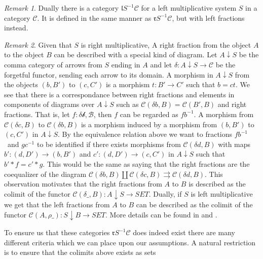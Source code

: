 \documentclass[12pt]{article}
\theoremstyle{definition}
\theoremstyle{remark}
\newtheorem*{remark}{Remark}
\begin{document}
            \begin{remark}
                Dually there is a category $\mathfrak{l}S^{-1}\mathcal{C}$ for a left multiplicative system $S$ in a category $\mathcal{C}$. It is defined in the same manner as $\mathfrak{r}S^{-1}\mathcal{C}$, but with left fractions instead.
            \end{remark}

            \begin{remark}
                Given that $S$ is right multiplicative, A right fraction from the object $A$ to the object $B$ can be described with a special kind of diagram. Let $A\downarrow S$ be the comma category of arrows from $S$ ending in $A$ and let $\delta : A\downarrow S\rightarrow\mathcal{C}$ be the forgetful functor, sending each arrow to its domain. A morphism in $A\downarrow S$ from the objects $(b,B')$ to $(c,C')$ is a morphism $t : B'\rightarrow C'$ such that $b=ct$. We see that there is a correspondance between right fractions and elements in components of diagrams over $A\downarrow S$ such as $\mathcal{C}(\delta b, B)=\mathcal{C}(B',B)$ and right fractions. That is, let $f:\mathcal{\delta b, B}$, then $f$ can be regarded as $fb^{-1}$. A morphism from $\mathcal{C}(\delta c, B)$ to $\mathcal{C}(\delta b, B)$ is a morphism induced by a morphism from $(b,B')$ to $(c,C')$ in $A\downarrow S$. By the equivalence relation above we want to fractions $fb^{-1}$ and $gc^{-1}$ to be identified if there exists morphisms from $\mathcal{C}(\delta d, B)$ with maps $b' : (d,D')\rightarrow (b,B')$ and $c' : (d,D')\rightarrow (c,C')$ in $A\downarrow S$ such that $b'*f = c'*g$. This would be the same as saying that the right fractions are the coequalizer of the diagram $\mathcal{C}(\delta b, B)\coprod \mathcal{C}(\delta c, B)\rightrightarrows \mathcal{C}(\delta d, B)$. This observation motivates that the right fractions from $A$ to $B$ is described as the colimit of the functor $\mathcal{C}(\delta\_, B):A\downarrow S\rightarrow SET$. Dually, if $S$ is left multiplicative we get that the left fractions from $A$ to $B$ can be described as the colimit of the functor $\mathcal{C}(A, \rho\_):S\downarrow B\rightarrow SET$. More details can be found in \cite{zisman} and \cite{weibel}.
            \end{remark}

            To ensure us that these categories $\mathfrak{r}S^{-1}\mathcal{C}$ does indeed exist there are many different criteria which we can place upon our assumptions. A natural restriction is to ensure that the colimits above exists as sets
\end{document}

